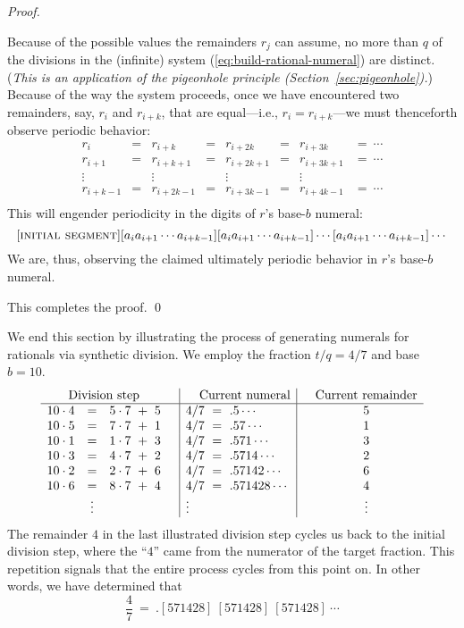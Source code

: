 \begin{proof}
\begin{enumerate}
Because of the possible values the remainders $r_j$ can assume, no
more than $q$ of the divisions in the (infinite) system
(\ref{eq:build-rational-numeral}) are distinct.  ({\em This is an
  application of the pigeonhole principle
  (Section~\ref{sec:pigeonhole}).})  Because of the way the system
proceeds, once we have encountered two remainders, say, $r_i$ and
$r_{i+k}$, that are equal---i.e., $r_i = r_{i+k}$---we must
thenceforth observe periodic behavior:
\[
\begin{array}{cccccccc}
r_i       & = & r_{i+k}    & = & r_{i+2k}   & = & r_{i+3k}   & = \ \cdots \\
r_{i+1}   & = & r_{i+k+1}  & = & r_{i+2k+1} & = & r_{i+3k+1} & = \ \cdots \\
\vdots    &   & \vdots     &   & \vdots     &   & \vdots     & \\
r_{i+k-1} & = & r_{i+2k-1} & = & r_{i+3k-1} & = & r_{i+4k-1} & = \ \cdots \\
\end{array}
\]
This will engender periodicity in the digits of $r$'s base-$b$ numeral:
\[ [\mbox{\sc initial segment}]
 [a_i a_{i+1} \cdots a_{i+k-1}]
          [a_i a_{i+1} \cdots a_{i+k-1}]
    \cdots  [a_i a_{i+1} \cdots a_{i+k-1}] \cdots 
\]
We are, thus, observing the claimed ultimately periodic behavior in
$r$'s base-$b$ numeral.
\end{enumerate}
This completes the proof. \qed
\end{proof}

\bigskip

We end this section by illustrating the process of generating numerals
for rationals via synthetic division.  We employ the fraction $t/q = 4/7$
and base $b = 10$.
\[
\begin{array}{lclc|l|cc}
\multicolumn{3}{c}{\mbox{Division step}} & &  \hspace*{.15in} \mbox{Current numeral} & &
\mbox{Current remainder} \\
\hline
10 \cdot 4   & = & 5 \cdot 7 \ + \ 5 &
      & 4/7 \ = \ .5 \cdots &
      & 5 \\
10 \cdot 5 & = & 7 \cdot 7 \ + \ 1 &
      & 4/7 \ = \ .57 \cdots &
      & 1 \\
10 \cdot 1 & = & 1 \cdot 7 \ + \ 3 &
      & 4/7 \ = \ .571 \cdots &
      & 3 \\
10 \cdot 3 & = & 4 \cdot 7 \ + \ 2 &
      & 4/7 \ = \ .5714 \cdots &
      & 2 \\
10 \cdot 2 & = & 2 \cdot 7 \ + \ 6 &
      & 4/7 \ = \ .57142 \cdots &
      & 6 \\
10 \cdot 6 & = & 8 \cdot 7 \ + \ 4 &
      & 4/7 \ = \ .571428 \cdots &
      & 4 \\
 & \vdots & & & \vdots & & \vdots
\end{array}
\]
The remainder $4$ in the last illustrated division step cycles us back
to the initial division step, where the ``$4$'' came from the
numerator of the target fraction.  This repetition signals that the
entire process cycles from this point on.  In other words, we have
determined that
\[ \frac{4}{7} \ = \ .[571428] \ [571428] \ [571428] \ \cdots \]

